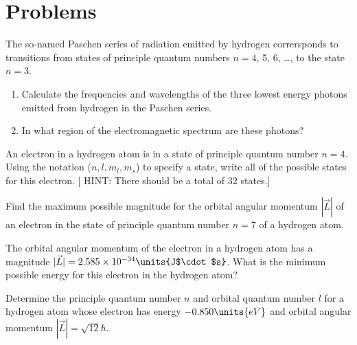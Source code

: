 \newpage

\section*{Problems}
\label{sec:3D_and_semiconductors_problems}




\begin{problem}
  The so-named Paschen series of radiation emitted by hydrogen
  corrersponds to transitions from states of principle quantum numbers
  $n = 4$, 5, 6, \dots, to the state $n = 3$.
\begin{enumerate}
\item Calculate the frequencies and wavelengths of the three lowest
  energy photons emitted from hydrogen in the Paschen series.
\item In what region of the electromagnetic spectrum are these
  photons?
\end{enumerate}
\end{problem}


\begin{problem}
  An electron in a hydrogen atom is in a state of principle quantum
  number $n = 4$.  Using the notation ($n, l, m_l, m_s$) to specify a
  state, write all of the possible states for this electron. [ HINT:
  There should be a total of $32$ states.]
\end{problem}


\begin{problem}
  Find the maximum possible magnitude for the orbital angular momentum
  $|\vec{L}|$ of an electron in the state of principle quantum number
  $n = 7$ of a hydrogen atom.
\end{problem}


\begin{problem}
  The orbital angular momentum of the electron in a hydrogen atom has
  a magnitude $|\vec{L}| = 2.585 \times 10^{-34}
  \units{J$\cdot$s}$. What is the minimum possible energy for this
  electron in the hydrogen atom?
\end{problem}


\begin{problem}
  Determine the principle quantum number $n$ and orbital quantum
  number $l$ for a hydrogen atom whose electron has energy $-0.850
  \units{eV}$ and orbital angular momentum $|\vec{L}| = \sqrt{12}
  \hbar$.
\end{problem}

